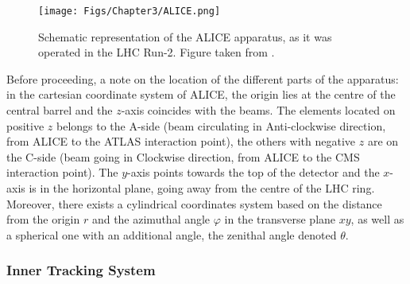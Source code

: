 \begin{figure}[t]
	\centering
	\texttt{[image: Figs/Chapter3/ALICE.png]}
	\caption{Schematic representation of the ALICE apparatus, as it was operated in the LHC Run-2. Figure taken from \cite{alicecollaborationALICEExperimentJourney2022}.}
	\label{fig:ALICEdetector}
\end{figure}

Before proceeding, a note on the location of the different parts of the apparatus: in the cartesian coordinate system of ALICE, the origin lies at the centre of the central barrel and the $z$-axis coincides with the beams. The elements located on positive $z$ belongs to the A-side (beam circulating in Anti-clockwise direction, from ALICE to the ATLAS interaction point), the others with negative $z$ are on the C-side (beam going in Clockwise direction, from ALICE to the CMS interaction point). The $y$-axis points towards the top of the detector and the $x$-axis is in the horizontal plane, going away from the centre of the LHC ring. Moreover, there exists a cylindrical coordinates system based on the distance from the origin $r$ and the azimuthal angle $\varphi$ in the transverse plane $xy$, as well as a spherical one with an additional angle, the zenithal angle denoted $\theta$.



\subsubsection{Inner Tracking System}
\label{subsubsec:ITS}

